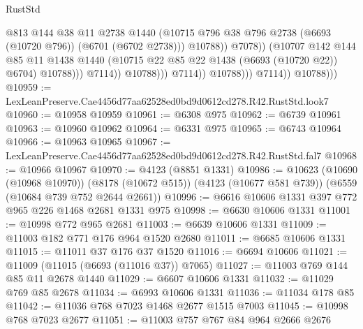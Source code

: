 \begin{lexlean}{RustStd}
\begin{coremodule}
                                              @813
                                              @144
                                              @38
                                              @11
                                              @2738
                                              @1440
                                              (@10715
                                                @796
                                                @38
                                                @796
                                                @2738
                                                (@6693 (@10720 @796))
                                                (@6701 (@6702 @2738)))
                                              @10788))
                                          @7078))
                                      (@10707
                                        @142
                                        @144
                                        @85
                                        @11
                                        @1438
                                        @1440
                                        (@10715 @22 @85 @22 @1438 (@6693 (@10720 @22)) @6704)
                                        @10788)))
                                  @7114))
                              @10788)))
                        @7114))
                    @10788)))
              @7114))
          @10788)))
@10959 := LexLeanPreserve.Cae4456d77aa62528ed0bd9d0612cd278.R42.RustStd.look7
@10960 := @10958 @10959
@10961 := @6308 @975
@10962 := @6739 @10961
@10963 := @10960 @10962
@10964 := @6331 @975
@10965 := @6743 @10964
@10966 := @10963 @10965
@10967 := LexLeanPreserve.Cae4456d77aa62528ed0bd9d0612cd278.R42.RustStd.fal7
@10968 := @10966 @10967
@10970 := @4123 (@8851 @1331)
@10986 := @10623
    (@10690 (@10968 @10970))
    (@8178 (@10672 @515))
    (@4123 (@10677 @581 @739))
    (@6559 (@10684 @739 @752 @2644 @2661))
@10996 := @6616 @10606 @1331 @397 @772 @965 @226 @1468 @2681 @1331 @975
@10998 := @6630 @10606 @1331
@11001 := @10998 @772 @965 @2681
@11003 := @6639 @10606 @1331
@11009 := @11003 @182 @771 @176 @964 @1520 @2680
@11011 := @6685 @10606 @1331
@11015 := @11011 @37 @176 @37 @1520
@11016 := @6694 @10606
@11021 := @11009 (@11015 (@6693 (@11016 @37)) @7065)
@11027 := @11003 @769 @144 @85 @11 @2678 @1440
@11029 := @6607 @10606 @1331
@11032 := @11029 @769 @85 @2678
@11034 := @6993 @10606 @1331
@11036 := @11034 @178 @85
@11042 := @11036 @768 @7023 @1468 @2677 @1515 @7003
@11045 := @10998 @768 @7023 @2677
@11051 := @11003 @757 @767 @84 @964 @2666 @2676

\end{coremodule}
\end{lexlean}

